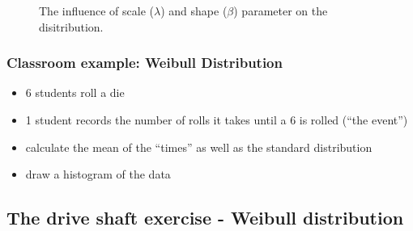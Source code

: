 \documentclass[
  a4paper,
]{scrbook}
\providecommand{\tightlist}{%
  \setlength{\itemsep}{0pt}\setlength{\parskip}{0pt}}\usepackage{longtable,booktabs,array}
\begin{document}
\begin{figure}[ht]


\caption{\label{fig-wbll-dist-slides}The influence of scale
(\(\lambda\)) and shape (\(\beta\)) parameter on the disitribution.}

\end{figure}%

\subsubsection{Classroom example: Weibull
Distribution}\label{classroom-example-weibull-distribution}

\begin{itemize}
\tightlist
\item
  6 students roll a die
\item
  1 student records the number of rolls it takes until a \(6\) is rolled
  (``the event'')
\item
  calculate the mean of the ``times'' as well as the standard
  distribution
\item
  draw a histogram of the data
\end{itemize}

\subsection{The drive shaft exercise - Weibull
distribution}\label{the-drive-shaft-exercise---weibull-distribution}
\end{document}
